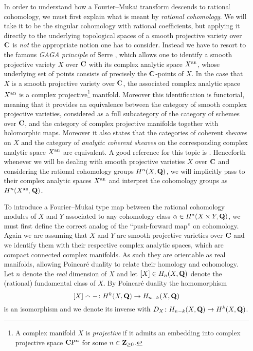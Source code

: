In order to understand how a Fourier--Mukai transform descends to rational cohomology, we must first explain what is meant by \emph{rational cohomology}. We will take it to be the singular cohomology with rational coefficients, but applying it directly to the underlying topological spaces of a smooth projective variety over $\mathbf C$ is \emph{not} the appropriate notion one has to consider. Instead we have to resort to the famous \emph{GAGA principle} of Serre \cite{Serre1956}, which allows one to identify a smooth projective variety $X$ over $\mathbf C$ with its complex analytic space $X^{\operatorname{an}}$, whose underlying set of points consists of precisely the $\mathbf C$-points of $X$. In the case that $X$ is a smooth projective variety over $\mathbf C$, the associated complex analytic space $X^{\operatorname{an}}$ is a complex projective\footnote{
    A complex manifold $X$ is \emph{projective} if it admits an embedding into complex projective space $\mathbf C\mathrm{P}^n$ for some $n \in \mathbf Z_{\geq 0}$.
} manifold. Moreover this identification is functorial, meaning that it provides an equivalence between the category of smooth complex projective varieties, considered as a full subcategory of the category of schemes over $\mathbf C$, and the category of complex projective manifolds together with holomorphic maps. Moreover it also states that the categories of coherent sheaves on $X$ and the category of \emph{analytic coherent sheaves} on the corresponding complex analytic space $X^{\operatorname{an}}$ are equivalent. A good reference for this topic is \cite{GriffithsAdams1984}. Henceforth whenever we will be dealing with smooth projective varieties $X$ over $\mathbf C$ and considering the rational cohomology groups $H^{n}(X, \mathbf Q)$, we will implicitly pass to their complex analytic spaces $X^{\operatorname{an}}$ and interpret the cohomology groups as $H^{n}(X^{\operatorname{an}}, \mathbf Q)$.


To introduce a Fourier--Mukai type map between the rational cohomology modules of $X$ and $Y$ associated to any cohomology class $\alpha \in H^{*}(X \times Y, \mathbf Q)$, we must first define the correct analog of the ``push-forward map'' on cohomology. Again we are assuming that $X$ and $Y$ are smooth projective varieties over $\mathbf C$ and we identify them with their respective complex analytic spaces, which are compact connected complex manifolds.
As such they are orientable as real manifolds, allowing Poincaré duality to relate their homology and cohomology. Let $n$ denote the \emph{real} dimension of $X$ and let $[X] \in H_n(X, \mathbf Q)$ denote the (rational) fundamental class of $X$. By Poincaré duality \cite[\S VI, Theorem 8.3]{Bredon1993} the homomorphism
\[
    [X] \smallfrown - \colon H^{k}(X, \mathbf Q) \to H_{n-k}(X, \mathbf Q)
\]
is an isomorphism and we denote its inverse with $D_X \colon H_{n-k}(X, \mathbf Q) \to H^{k}(X, \mathbf Q)$.

